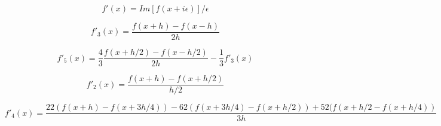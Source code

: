 \documentclass{article}
\begin{document}
\[ f'(x) = Im[f(x + i\epsilon)] / \epsilon \]
\pagebreak

\[ f'_3(x) = \frac{f(x + h) - f(x - h)}{2h} \]
\pagebreak

\[ f'_5(x) = \frac{4}{3}\frac{f(x + h/2) - f(x - h/2)}{2h} - \frac{1}{3}f'_3(x) \]
\pagebreak

\[ f'_2(x) = \frac{f(x + h) - f(x + h/2)}{h/2} \]
\pagebreak

\[ f'_4(x) = \frac{22(f(x + h) - f(x + 3h/4)) - 62(f(x + 3h/4) - f(x + h/2)) + 52(f(x + h/2 - f(x + h/4))}{3h} \]
\pagebreak

\[ \]
\pagebreak
\end{document}
